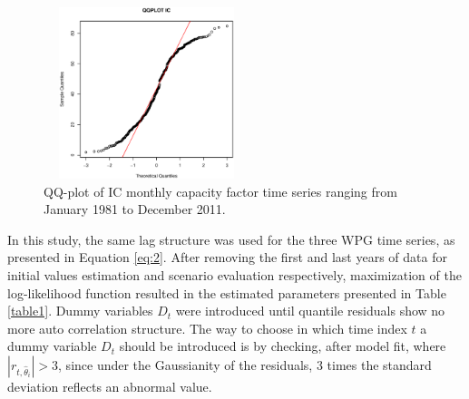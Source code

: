 \documentclass[a4paper]{IEEEtran}
\begin{document}

\begin{figure}[htbp]
	\centering
	\includegraphics[height=5cm,width=6cm]{figures/IC_QQ.eps}
	\caption{QQ-plot of IC monthly capacity factor time series ranging from January 1981 to December 2011.}
	\label{qq_IC}
\end{figure}


In this study, the same lag structure was used for the three WPG time series, as presented in Equation \eqref{eq:2}. After removing the first and last years of data for initial values estimation and scenario evaluation respectively, maximization of the log-likelihood function resulted in the estimated parameters presented in Table \ref{table1}. Dummy variables $D_t$ were introduced until quantile residuals show no more auto correlation structure. The way to choose in which time index $t$ a dummy variable $D_t$ should be introduced is by checking, after model fit, where $|r_{t,\hat{\theta}_i}|>3$, since under the Gaussianity of the residuals, 3 times the standard deviation reflects an abnormal value. 
\end{document}
